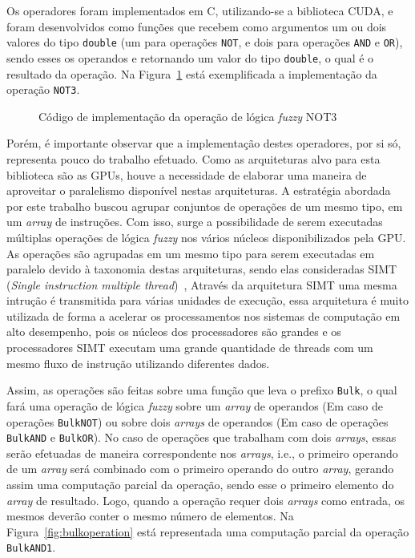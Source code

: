 \documentclass[12pt]{article}
\begin{document}
Os operadores foram implementados em C, utilizando-se a biblioteca CUDA, e foram desenvolvidos como funções que recebem como argumentos um ou dois valores do tipo \texttt{double} (um para operações \texttt{NOT}, e dois para operações \texttt{AND} e \texttt{OR}), sendo esses os operandos e retornando um valor do tipo \texttt{double}, o qual é o resultado da operação. Na Figura~\ref{fig:operation} está exemplificada a implementação da operação \texttt{NOT3}.

\begin{figure}[!h]
\centering

\caption{Código de implementação da operação de lógica \textit{fuzzy} NOT3}
\label{fig:operation}
\end{figure}

Porém, é importante observar que a implementação destes operadores, por si só, representa pouco do trabalho efetuado. Como as arquiteturas alvo para esta biblioteca são as GPUs, houve a necessidade de elaborar uma maneira de aproveitar o paralelismo disponível nestas arquiteturas. A estratégia abordada por este trabalho buscou agrupar conjuntos de operações de um mesmo tipo, em um \textit{array} de instruções. Com isso, surge a possibilidade de serem executadas múltiplas operações de lógica \textit{fuzzy} nos vários núcleos disponibilizados pela GPU. As operações são agrupadas em um mesmo tipo para serem executadas em paralelo devido à taxonomia destas arquiteturas, sendo elas consideradas SIMT (\textit{Single instruction multiple thread})~\cite{keckler:11}, Através da arquitetura SIMT uma mesma intrução é transmitida para várias unidades de execução, essa arquitetura é muito utilizada de forma a acelerar os processamentos nos sistemas de computação em alto desempenho, pois os núcleos dos processadores são grandes e os processadores SIMT executam uma grande quantidade de threads com um mesmo fluxo de instrução utilizando diferentes dados. \cite{lain:12}


Assim, as operações são feitas sobre uma função que leva o prefixo \texttt{Bulk}, o qual fará uma operação de lógica \textit{fuzzy} sobre um \textit{array} de operandos (Em caso de operações \texttt{BulkNOT}) ou sobre dois \textit{arrays} de operandos (Em caso de operações \texttt{BulkAND} e \texttt{BulkOR}). No caso de operações que trabalham com dois \textit{arrays}, essas serão efetuadas de maneira correspondente nos \textit{arrays}, i.e., o primeiro operando de um \textit{array} será combinado com o primeiro operando do outro \textit{array}, gerando assim uma computação parcial da operação, sendo esse o primeiro elemento do \textit{array} de resultado. Logo, quando a operação requer dois \textit{arrays} como entrada, os mesmos deverão conter o mesmo número de elementos. Na Figura~\ref{fig:bulkoperation} está representada uma computação parcial da operação \texttt{BulkAND1}.
\end{document}
